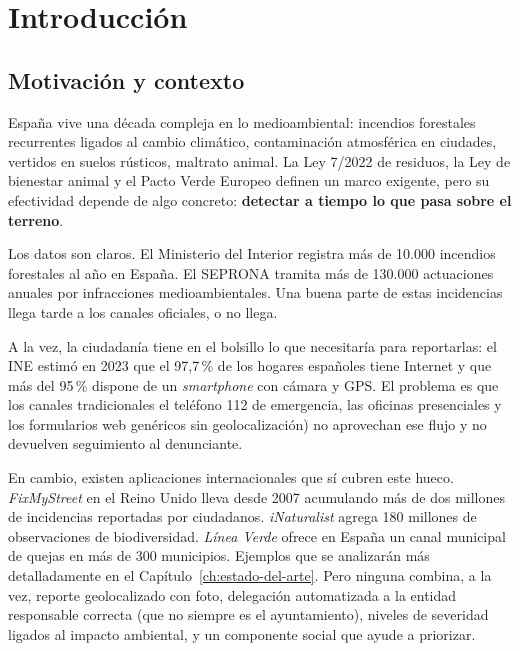 \chapter{Introducción}
\label{ch:introduccion}

\section{Motivación y contexto}
\label{sec:motivacion}

España vive una década compleja en lo medioambiental: incendios forestales recurrentes ligados al cambio climático, contaminación atmosférica en ciudades, vertidos en suelos rústicos, maltrato animal. La Ley 7/2022 de residuos, la Ley de bienestar animal y el Pacto Verde Europeo definen un marco exigente, pero su efectividad depende de algo concreto: \textbf{detectar a tiempo lo que pasa sobre el terreno}.

Los datos son claros. El Ministerio del Interior registra más de 10.000 incendios forestales al año en España. El SEPRONA tramita más de 130.000 actuaciones anuales por infracciones medioambientales. Una buena parte de estas incidencias llega tarde a los canales oficiales, o no llega.

A la vez, la ciudadanía tiene en el bolsillo lo que necesitaría para reportarlas: el INE estimó en 2023 que el 97{,}7\,\% de los hogares españoles tiene Internet y que más del 95\,\% dispone de un \textit{smartphone} con cámara y GPS. El problema es que los canales tradicionales el teléfono 112 de emergencia, las oficinas presenciales y los formularios web genéricos sin geolocalización) no aprovechan ese flujo y no devuelven seguimiento al denunciante.

En cambio, existen aplicaciones internacionales que sí cubren este hueco. \textit{FixMyStreet} en el Reino Unido lleva desde 2007 acumulando más de dos millones de incidencias reportadas por ciudadanos. \textit{iNaturalist} agrega 180 millones de observaciones de biodiversidad. \textit{Línea Verde} ofrece en España un canal municipal de quejas en más de 300 municipios. Ejemplos que se analizarán más detalladamente en el Capítulo~\ref{ch:estado-del-arte}. Pero ninguna combina, a la vez, reporte geolocalizado con foto, delegación automatizada a la entidad responsable correcta (que no siempre es el ayuntamiento), niveles de severidad ligados al impacto ambiental, y un componente social que ayude a priorizar.


